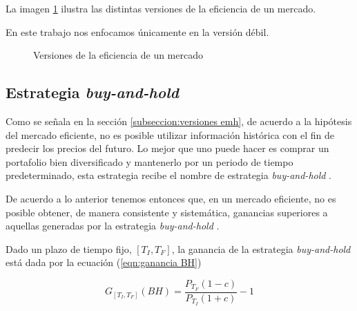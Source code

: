 \documentclass[12pt]{scrbook}
\theoremstyle{break}
\theoremstyle{break}
\newcommand{\buyhold}{\textit{buy-and-hold }}
\begin{document}
La imagen \ref{imagen:versiones emh} ilustra las distintas versiones de la eficiencia de un mercado.

En este trabajo nos enfocamos únicamente en la versión débil.

\begin{figure}[ht]
\centering
{}
\caption{\label{imagen:versiones emh} Versiones de la eficiencia de un mercado}
\end{figure}


\subsection{Estrategia \buyhold}
\label{seccion:buy and hold}
Como se señala en la sección \ref{subseccion:versiones emh}, de acuerdo a la hipótesis del mercado eficiente, no es posible utilizar información histórica con el fin de predecir los precios del futuro. Lo mejor que uno puede hacer es comprar un portafolio bien diversificado y mantenerlo por un periodo de tiempo predeterminado, esta estrategia recibe el nombre de estrategia \buyhold.

De acuerdo a lo anterior tenemos entonces que, en un mercado eficiente, no es posible obtener, de manera consistente y sistemática, ganancias superiores a aquellas generadas por la estrategia \buyhold.

Dado un plazo de tiempo fijo, $\left[T_{I}, T_{F}\right]$, la ganancia de la estrategia \buyhold está dada por la ecuación (\ref{eqn:ganancia BH})

\begin{equation} \label{eqn:ganancia BH}
G_{\left[T_{I}, T_{F}\right]} (BH) = \dfrac{P_{T_F} (1 - c) } { P_{T_I} (1 + c) } - 1
\end{equation}
\end{document}
